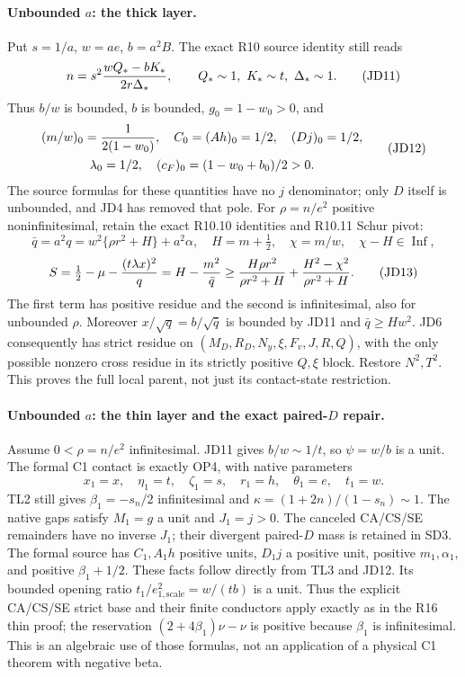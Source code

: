 \paragraph{Unbounded $a$: the thick layer.}
Put $s=1/a$, $w=ae$, $b=a^2B$.  The exact R10 source identity
still reads
\[
 n=s^2{wQ_*-bK_*\over2r\Delta_*},\qquad
 Q_*\sim1,\ K_*\sim t,\ \Delta_*\sim1.             \tag{JD11}
\]
Thus $b/w$ is bounded, $b$ is bounded, $g_0=1-w_0>0$, and
\[
\begin{gathered}
 (m/w)_0={1\over2(1-w_0)},\quad C_0=(Ah)_0=1/2,
 \quad (Dj)_0=1/2,\\ \lambda_0=1/2,
 \quad(c_F)_0=(1-w_0+b_0)/2>0.
\end{gathered}                       \tag{JD12}
\]
The source formulas for these quantities have no $j$ denominator;
only $D$ itself is unbounded, and JD4 has removed that pole.
For $\rho=n/e^2$ positive noninfinitesimal, retain the exact R10.10
identities and R10.11 Schur pivot:
\[
 \bar q=a^2q=w^2\{\rho r^2+H\}+a^2\alpha,
 \quad H=m+\tfrac12,\quad \chi=m/w,
 \quad \chi-H\in\operatorname{Inf},
\]
\[
 S=\tfrac12-\mu-{(t\lambda x)^2\over q}
 =H-{m^2\over\bar q}
 \ge {H\rho r^2\over\rho r^2+H}
       +{H^2-\chi^2\over\rho r^2+H}.                 \tag{JD13}
\]
The first term has positive residue and the second is infinitesimal,
also for unbounded $\rho$.  Moreover $x/\sqrt q=b/\sqrt{\bar q}$
is bounded by JD11 and $\bar q\ge Hw^2$.  JD6 consequently has
strict residue on $(M_D,R_D,N_y,\xi,F_v,J,R,Q)$, with the only
possible nonzero cross residue in its strictly positive $Q,\xi$
block.  Restore $N^2,T^2$.  This proves the full local parent, not
just its contact-state restriction.

\paragraph{Unbounded $a$: the thin layer and the exact paired-$D$ repair.}
Assume $0<\rho=n/e^2$ infinitesimal.  JD11 gives
$b/w\sim1/t$, so $\psi=w/b$ is a unit.  The formal C1 contact is
exactly OP4, with native parameters
\[
 x_1=x,\quad\eta_1=t,\quad\zeta_1=s,\quad r_1=h,
 \quad\theta_1=e,\quad t_1=w.
\]
TL2 still gives $\beta_1=-s_n/2$ infinitesimal and
$\kappa=(1+2n)/(1-s_n)\sim1$.  The native gaps satisfy
$M_1=g$ a unit and $J_1=j>0$.  The canceled CA/CS/SE remainders
have no inverse $J_1$; their divergent paired-$D$ mass is retained
in SD3.  The formal source has $C_1,A_1h$ positive units,
$D_1j$ a positive unit, positive $m_1,\alpha_1$, and positive
$\beta_1+1/2$.  These facts follow directly from TL3 and JD12.
Its bounded opening ratio $t_1/e_{1,\mathrm{scale}}^2=w/(tb)$
is a unit.  Thus the explicit CA/CS/SE strict base and their finite
conductors apply exactly as in the R16 thin proof; the reservation
$(2+4\beta_1)\nu-\nu$ is positive because $\beta_1$ is
infinitesimal.  This is an algebraic use of those formulas, not an
application of a physical C1 theorem with negative beta.

